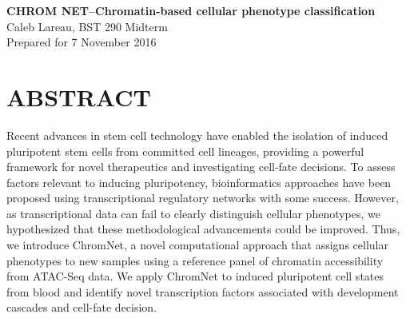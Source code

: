 \documentclass[12pt]{article}
\begin{document}
    \begin{flushleft}
    \textbf{
    {\huge C}{\Large HROM} {\huge N}{\Large ET--Chromatin-based cellular phenotype classification}}\\
     \hspace*{4mm} Caleb Lareau, BST 290 Midterm\\
     \hspace*{4mm} Prepared for 7 November 2016
         \end{flushleft}

\section{\textbf{{\Large A}{\small BSTRACT }}}
Recent advances in stem cell technology have enabled the isolation of induced pluripotent stem cells from committed cell lineages, providing a powerful framework for novel therapeutics and investigating cell-fate decisions. To assess factors relevant to inducing pluripotency, bioinformatics approaches have been proposed using transcriptional regulatory networks with some success. However, as transcriptional data can fail to clearly distinguish cellular phenotypes, we hypothesized that these methodological advancements could be improved. Thus, we introduce ChromNet, a novel computational approach that assigns cellular phenotypes to new samples using a reference panel of chromatin accessibility from ATAC-Seq data. We apply ChromNet to induced pluripotent cell states from blood and identify novel transcription factors associated with development cascades and cell-fate decision. 
\end{document}
